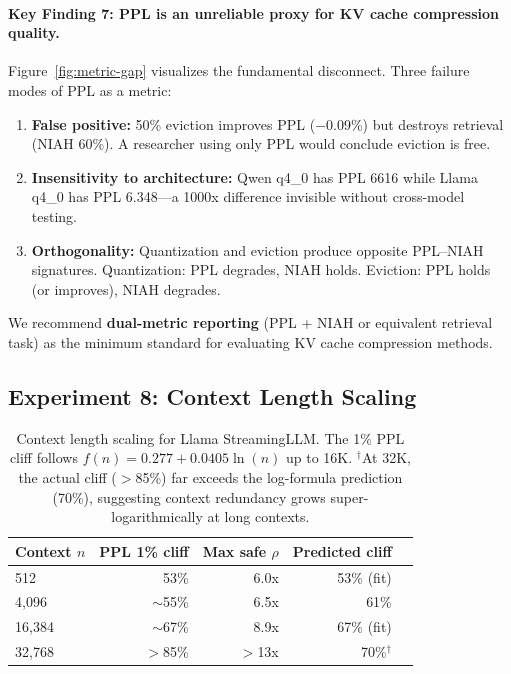 \paragraph{Key Finding 7: PPL is an unreliable proxy for KV cache compression quality.}
Figure~\ref{fig:metric-gap} visualizes the fundamental disconnect. Three failure modes of PPL as a metric:
\begin{enumerate}
    \item \textbf{False positive:} 50\% eviction improves PPL ($-$0.09\%) but destroys retrieval (NIAH 60\%). A researcher using only PPL would conclude eviction is free.
    \item \textbf{Insensitivity to architecture:} Qwen q4\_0 has PPL 6616 while Llama q4\_0 has PPL 6.348---a 1000x difference invisible without cross-model testing.
    \item \textbf{Orthogonality:} Quantization and eviction produce opposite PPL--NIAH signatures. Quantization: PPL degrades, NIAH holds. Eviction: PPL holds (or improves), NIAH degrades.
\end{enumerate}

We recommend \textbf{dual-metric reporting} (PPL + NIAH or equivalent retrieval task) as the minimum standard for evaluating KV cache compression methods.

\subsection{Experiment 8: Context Length Scaling}
\label{sec:exp-context-scaling}

\begin{table}[h]
\centering
\begin{tabular}{lrrrr}
\toprule
\textbf{Context $n$} & \textbf{PPL 1\% cliff} & \textbf{Max safe $\rho$} & \textbf{Predicted cliff} \\
\midrule
512   & 53\% & 6.0x  & 53\% (fit) \\
4,096 & $\sim$55\% & 6.5x  & 61\% \\
16,384 & $\sim$67\% & 8.9x & 67\% (fit) \\
32,768 & $>$85\% & $>$13x & 70\%$^\dagger$ \\
\bottomrule
\end{tabular}
\caption{Context length scaling for Llama StreamingLLM. The 1\% PPL cliff follows $f(n) = 0.277 + 0.0405 \ln(n)$ up to 16K. $^\dagger$At 32K, the actual cliff ($>$85\%) far exceeds the log-formula prediction (70\%), suggesting context redundancy grows super-logarithmically at long contexts.}
\label{tab:context-scaling}
\end{table}

